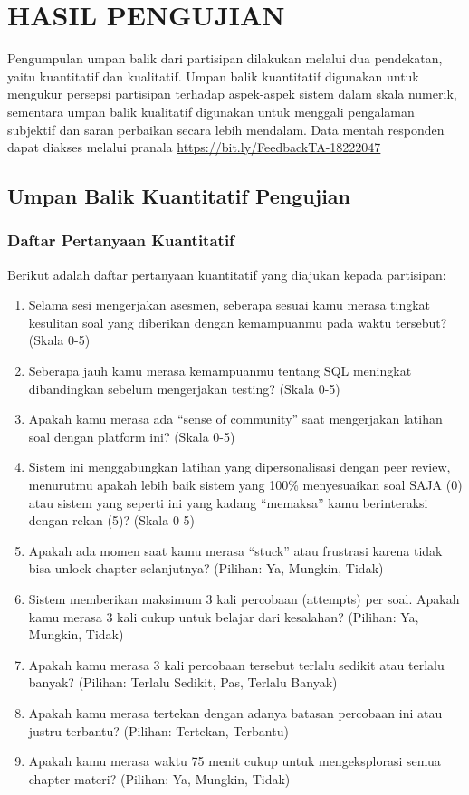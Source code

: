 \cleardoublepage
\chapter{HASIL PENGUJIAN}

Pengumpulan umpan balik dari partisipan dilakukan melalui dua pendekatan, yaitu kuantitatif dan kualitatif. Umpan balik kuantitatif digunakan untuk mengukur persepsi partisipan terhadap aspek-aspek sistem dalam skala numerik, sementara umpan balik kualitatif digunakan untuk menggali pengalaman subjektif dan saran perbaikan secara lebih mendalam. Data mentah responden dapat diakses melalui pranala \url{https://bit.ly/FeedbackTA-18222047}

\section{Umpan Balik Kuantitatif Pengujian}

\subsection{Daftar Pertanyaan Kuantitatif}
Berikut adalah daftar pertanyaan kuantitatif yang diajukan kepada partisipan:
\begin{enumerate}[1.]
    \item Selama sesi mengerjakan asesmen, seberapa sesuai kamu merasa tingkat kesulitan soal yang diberikan dengan kemampuanmu pada waktu tersebut? (Skala 0-5)
    \item Seberapa jauh kamu merasa kemampuanmu tentang SQL meningkat dibandingkan sebelum mengerjakan testing? (Skala 0-5)
    \item Apakah kamu merasa ada ``sense of community'' saat mengerjakan latihan soal dengan platform ini? (Skala 0-5)
    \item Sistem ini menggabungkan latihan yang dipersonalisasi dengan peer review, menurutmu apakah lebih baik sistem yang 100\% menyesuaikan soal SAJA (0) atau sistem yang seperti ini yang kadang ``memaksa'' kamu berinteraksi dengan rekan (5)? (Skala 0-5)
    \item Apakah ada momen saat kamu merasa ``stuck'' atau frustrasi karena tidak bisa unlock chapter selanjutnya? (Pilihan: Ya, Mungkin, Tidak)
    \item Sistem memberikan maksimum 3 kali percobaan (attempts) per soal. Apakah kamu merasa 3 kali cukup untuk belajar dari kesalahan? (Pilihan: Ya, Mungkin, Tidak)
    \item Apakah kamu merasa 3 kali percobaan tersebut terlalu sedikit atau terlalu banyak? (Pilihan: Terlalu Sedikit, Pas, Terlalu Banyak)
    \item Apakah kamu merasa tertekan dengan adanya batasan percobaan ini atau justru terbantu? (Pilihan: Tertekan, Terbantu)
    \item Apakah kamu merasa waktu 75 menit cukup untuk mengeksplorasi semua chapter materi? (Pilihan: Ya, Mungkin, Tidak)
\end{enumerate}

